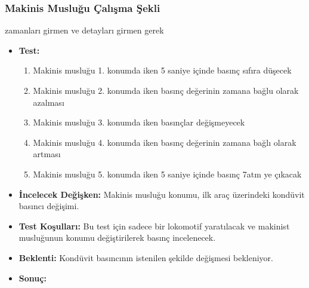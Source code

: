 \documentclass[10pt,a4paper]{article}
\begin{document}
\subsubsection{Makinis Musluğu Çalışma Şekli}
zamanları girmen ve detayları girmen gerek
\begin{itemize}
\item \textbf{Test:} 
\begin{enumerate}
\item Makinis musluğu 1. konumda iken 5 saniye içinde basınç sıfıra düşecek
\item Makinis musluğu 2. konumda iken basınç değerinin zamana bağlu olarak azalması
\item Makinis musluğu 3. konumda iken basınçlar değişmeyecek
\item Makinis musluğu 4. konumda iken basınç değerinin zamana bağlı olarak artması
\item Makinis musluğu 5. konumda iken 5 saniye içinde basınç 7atm ye çıkacak
\end{enumerate}
\item \textbf{İncelecek Değişken:} Makinis musluğu konumu, ilk araç üzerindeki kondüvit basıncı değişimi.\\
\item \textbf{Test Koşulları:} Bu test için sadece bir lokomotif yaratılacak ve makinist musluğunun konumu değiştirilerek basınç incelenecek.\\

\item \textbf{Beklenti:} Kondüvit basıncının istenilen şekilde değişmesi bekleniyor.\\
\item \textbf{Sonuç:}
\end{itemize}
\end{document}
